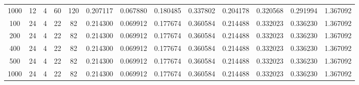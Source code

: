 \begin{table}[h]
\begin{tabular}{ccccccccccccc}
1000 & 12 & 4 & 60 & 120 & 0.207117 & 0.067880 & 0.180485 & 0.337802 & 0.204178 & 0.320568 & 0.291994 & 1.367092 \\
100 & 24 & 4 & 22 & 82 & 0.214300 & 0.069912 & 0.177674 & 0.360584 & 0.214488 & 0.332023 & 0.336230 & 1.367092 \\
200 & 24 & 4 & 22 & 82 & 0.214300 & 0.069912 & 0.177674 & 0.360584 & 0.214488 & 0.332023 & 0.336230 & 1.367092 \\
400 & 24 & 4 & 22 & 82 & 0.214300 & 0.069912 & 0.177674 & 0.360584 & 0.214488 & 0.332023 & 0.336230 & 1.367092 \\
500 & 24 & 4 & 22 & 82 & 0.214300 & 0.069912 & 0.177674 & 0.360584 & 0.214488 & 0.332023 & 0.336230 & 1.367092 \\
1000 & 24 & 4 & 22 & 82 & 0.214300 & 0.069912 & 0.177674 & 0.360584 & 0.214488 & 0.332023 & 0.336230 & 1.367092 \\
\bottomrule
\end{tabular}
\end{table}
